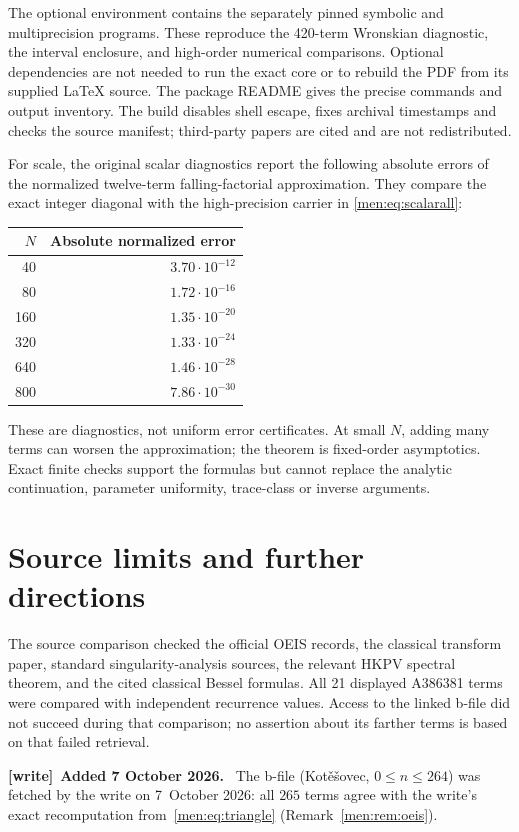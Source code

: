 \documentclass[11pt,letterpaper]{article}
\theoremstyle{remark}\newtheorem{remark}[theorem]{Remark}
\newenvironment{writenote}[1][]{\par\smallskip\begingroup\small
 \noindent\textbf{[write]}\if\relax\detokenize{#1}\relax\else~\textbf{#1.}\fi\ }%
 {\par\endgroup\smallskip}
\begin{document}
The optional environment contains the separately pinned symbolic and multiprecision programs. These reproduce the 420-term Wronskian diagnostic, the interval enclosure, and high-order numerical comparisons. Optional dependencies are not needed to run the exact core or to rebuild the PDF from its supplied \LaTeX{} source. The package README gives the precise commands and output inventory. The build disables shell escape, fixes archival timestamps and checks the source manifest; third-party papers are cited and are not redistributed.

For scale, the original scalar diagnostics report the following absolute errors of the normalized twelve-term falling-factorial approximation. They compare the exact integer diagonal with the high-precision carrier in \eqref{men:eq:scalarall}:
\begin{center}
\begin{tabular}{rr}
\toprule
$N$&Absolute normalized error\\\midrule
40&$3.70\cdot10^{-12}$\\
80&$1.72\cdot10^{-16}$\\
160&$1.35\cdot10^{-20}$\\
320&$1.33\cdot10^{-24}$\\
640&$1.46\cdot10^{-28}$\\
800&$7.86\cdot10^{-30}$\\\bottomrule
\end{tabular}
\end{center}
These are diagnostics, not uniform error certificates. At small $N$, adding many terms can worsen the approximation; the theorem is fixed-order asymptotics. Exact finite checks support the formulas but cannot replace the analytic continuation, parameter uniformity, trace-class or inverse arguments.

\section{Source limits and further directions}\label{men:sec:limits}
The source comparison checked the official OEIS records, the classical transform paper, standard singularity-analysis sources, the relevant HKPV spectral theorem, and the cited classical Bessel formulas. All 21 displayed A386381 terms were compared with independent recurrence values. Access to the linked b-file did not succeed during that comparison; no assertion about its farther terms is based on that failed retrieval.

\begin{writenote}[Added 7 October 2026]
The b-file (Kot\v{e}\v{s}ovec, $0\le n\le264$) was fetched by the write on
7~October 2026: all $265$ terms agree with the write's exact recomputation
from~\eqref{men:eq:triangle} (Remark~\ref{men:rem:oeis}).
\end{writenote}
\end{document}

